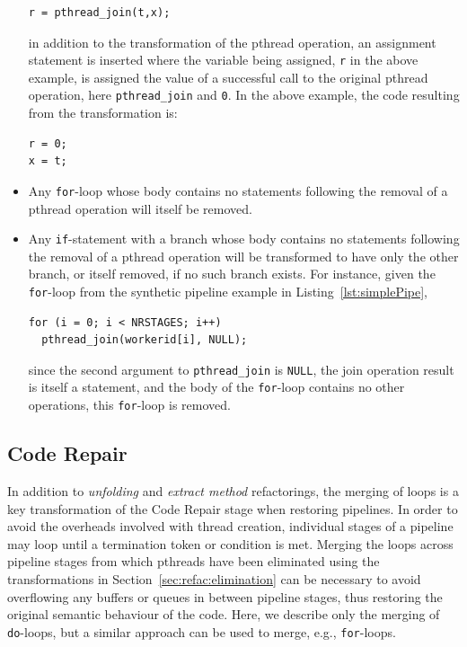 \begin{itemize}
%
\begin{lstlisting}
r = pthread_join(t,x);
\end{lstlisting}
%
in addition to the transformation of the pthread operation, an assignment statement is inserted where the variable being assigned, \lstinline|r| in the above example, is assigned the value of a successful call to the original pthread operation, here \lstinline|pthread_join| and \lstinline|0|. In the above example, the code resulting from the transformation is:
%
\begin{lstlisting}
r = 0;
x = t;
\end{lstlisting}

 
\item Any \texttt{for}-loop whose body contains no statements following the removal of a pthread operation will itself be removed.
\item Any \texttt{if}-statement with a branch whose body contains no statements following the removal of a pthread operation will be transformed to have only the other branch, or itself removed, if no such branch exists. For instance, given the \texttt{for}-loop from the synthetic pipeline example in Listing~\ref{lst:simplePipe},
%
\begin{lstlisting}[firstnumber=8]
for (i = 0; i < NRSTAGES; i++)
  pthread_join(workerid[i], NULL);
\end{lstlisting}
%
\noindent
since the second argument to \lstinline|pthread_join| is \lstinline|NULL|, the join operation result is itself a statement, and the body of the \lstinline{for}-loop contains no other operations, this \lstinline{for}-loop is removed.
\end{itemize}


\subsection{Code Repair}
\label{sec:refac:repair}

In addition to \emph{unfolding} and \emph{extract method} refactorings, the merging of loops is a key transformation of the Code Repair stage when restoring pipelines. In order to avoid the overheads involved with thread creation, individual stages of a pipeline may loop until a termination token or condition is met. Merging the loops across pipeline stages from which pthreads have been eliminated using the transformations in Section~\ref{sec:refac:elimination} can be necessary to avoid overflowing any buffers or queues in between pipeline stages, thus restoring the original semantic behaviour of the code. Here, we describe only the merging of \lstinline{do}-loops, but a similar approach can be used to merge, e.g., \lstinline{for}-loops.

